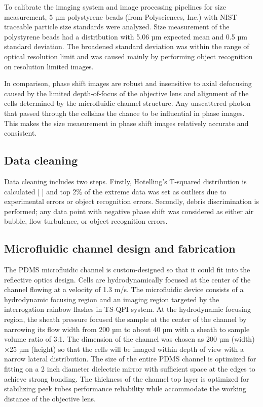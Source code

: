 \documentclass[aps,pra,preprint,superscriptaddress]{revtex4-1}
\begin{document}
To calibrate the imaging system and image processing pipelines for size measurement, 5 µm polystyrene beads (from Polysciences, Inc.) with NIST traceable particle size standards were analyzed. Size measurement of the polystyrene beads had a distribution with 5.06 µm expected mean and 0.5 µm standard deviation. The broadened standard deviation was within the range of optical resolution limit and was caused mainly by performing object recognition on resolution limited images.

In comparison, phase shift images are robust and insensitive to axial defocusing caused by the limited depth-of-focus of the objective lens and alignment of the cells determined by the microfluidic channel structure. Any unscattered photon that passed through the cellshas the chance to be influential in phase images. This makes the size measurement in phase shift images relatively accurate and consistent. 

\subsection{Data cleaning}

Data cleaning includes two steps. Firstly, Hotelling's T-squared distribution is calculated [ ] and top 2\% of the extreme data was set as outliers due to experimental errors or object recognition errors. Secondly, debris discrimination is performed; any data point with negative phase shift was considered as either air bubble, flow turbulence, or object recognition errors.

\subsection{Microfluidic channel design and fabrication}

The PDMS microfluidic channel is custom-designed so that it could fit into the reflective optics design. Cells are hydrodynamically focused \cite{knight1998hydrodynamic,lee2006hydrodynamic} at the center of the channel flowing at a velocity of 1.3 m/s. The microfluidic device consists of a hydrodynamic focusing region and an imaging region targeted by the interrogation rainbow flashes in TS-QPI system. At the hydrodynamic focusing region, the sheath pressure focused the sample at the center of the channel by narrowing its flow width from 200 µm to about 40 µm with a sheath to sample volume ratio of 3:1. The dimension of the channel was chosen as 200 µm (width) ×25 µm (height) so that the cells will be imaged within depth of view with a narrow lateral distribution. The size of the entire PDMS channel is optimized for fitting on a 2 inch diameter dielectric mirror with sufficient space at the edges to achieve strong bonding. The thickness of the channel top layer is optimized for stabilizing peek tubes performance reliability while accommodate the working distance of the objective lens. 
\end{document}
